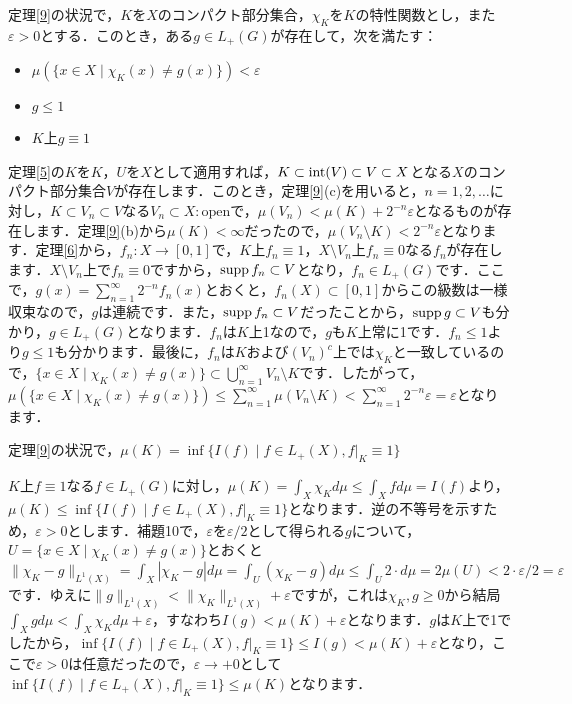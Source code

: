 \begin{ylem}\label{10}
定理\ref{9}の状況で，$K$を$X$のコンパクト部分集合，$\chi_{K}$を$K$の特性関数とし，また$\varepsilon >0$とする．このとき，ある$g \in L_{+}(G)$が存在して，次を満たす：
\begin{itemize}
 \item $\mu ( \{ x \in X \mid \chi_{K}(x) \neq g(x) \} ) < \varepsilon $
 \item $g \le 1$
 \item $K$上$g \equiv 1$
\end{itemize}
\end{ylem}
\begin{Proof}
定理\ref{5}の$K$を$K$，$U$を$X$として適用すれば，$K \subset \operatorname{int}(V) \subset V \subset X$となる$X$のコンパクト部分集合$V$が存在します．このとき，定理\ref{9}(c)を用いると，$n=1,2,\ldots$に対し，$K \subset V_n \subset V$なる$V_n \subset X : \mathrm{open}$で，$\mu(V_n) < \mu(K) + 2^{-n}\varepsilon$となるものが存在します．定理\ref{9}(b)から$\mu(K)<\infty$だったので，$\mu(V_n \setminus K) < 2^{-n}\varepsilon$となります．定理\ref{6}から，$f_n : X \to [0,1]$で，$K$上$f_n \equiv 1$，$X \setminus V_n$上$f_n \equiv 0$なる$f_n$が存在します．$X \setminus V_{n}$上で$f_{n} \equiv 0$ですから，$\operatorname{supp} f_{n} \subset V$となり，$f_{n} \in L_{+}(G)$です．ここで，$g(x)=\sum_{n=1}^{\infty}2^{-n}f_n(x)$とおくと，$f_{n}(X) \subset [0,1]$からこの級数は一様収束なので，$g$は連続です．また，$\operatorname{supp} f_{n} \subset V$だったことから，$\operatorname{supp} g \subset V$も分かり，$g \in L_{+}(G)$となります．$f_n$は$K$上1なので，$g$も$K$上常に1です．$f_n \le 1$より$g \le 1$も分かります．最後に，$f_n$は$K$および$(V_n)^{c}$上では$\chi_{K}$と一致しているので，$\{ x \in X \mid \chi_{K}(x) \neq g(x) \} \subset \bigcup_{n=1}^{\infty}V_n \setminus K$です．したがって，$\mu( \{ x \in X \mid \chi_{K}(x) \neq g(x) \} ) \le \sum_{n=1}^{\infty} \mu(V_n \setminus K) < \sum_{n=1}^{\infty}2^{-n}\varepsilon=\varepsilon$となります．
\end{Proof}
\begin{yprop}\label{11}
定理\ref{9}の状況で，$\mu(K)= \inf \{ I(f) \mid f \in L_{+}(X), f|_{K} \equiv 1 \}$
\end{yprop}
\begin{Proof}
$K$上$f \equiv 1$なる$f \in L_{+}(G)$に対し，$ \mu(K)=\int_{X}\chi_K d\mu \le \int_{X}f d\mu=I(f)$より，$\mu(K) \le \inf \{ I(f) \mid f \in L_{+}(X), f|_{K} \equiv 1 \}$となります．逆の不等号を示すため，$\varepsilon>0$とします．補題10で，$\varepsilon$を$\varepsilon /2$として得られる$g$について，$U=\{ x \in X \mid \chi_{K}(x) \neq g(x) \}$とおくと$\| \chi_{K}-g\| _{L^1(X)} = \int_{X}|\chi_K-g|d\mu = \int_{U}(\chi_K-g)d\mu \le \int_{U}2 \cdot d\mu=2\mu(U)<2 \cdot \varepsilon / 2=\varepsilon$です．ゆえに$\| g\|  _{L^1(X)} < \| \chi_{K} \| _{L^1(X)} +\varepsilon $ですが，これは$\chi_K, g \ge 0$から結局 $\int_{X}gd\mu < \int_{X}\chi_{K}d\mu +\varepsilon$，すなわち$I(g)<\mu (K)+\varepsilon$となります．$g$は$K$上で1でしたから，$\inf \{ I(f) \mid f \in L_{+}(X), f|_{K} \equiv 1 \} \le I(g) <\mu (K)+\varepsilon$となり，ここで$\varepsilon>0$は任意だったので，$\varepsilon \to +0$として $\inf \{ I(f) \mid f \in L_{+}(X), f|_{K} \equiv 1 \} \le \mu (K)$となります．
\end{Proof}

